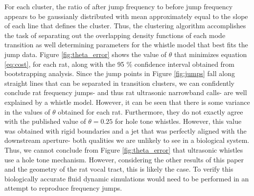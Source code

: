 \documentclass[twocolumn, prX]{revtex4}
\begin{document}
For each cluster, the ratio of after jump frequency to before jump frequency appears to be gaussianly distributed with mean approximately equal to the slope of each line that defines the cluster. Thus, the clustering algorithm accomplishes the task of separating out the overlapping density functions of each mode transition as well determining parameters for the whistle model that best fits the jump data. Figure \ref{fig:theta_error} shows the value of $\theta$ that minimizes equation \ref{eq:cost}, for each rat, along with the 95 \% confidence interval obtained from bootstrapping analysis. Since the jump points in Figure \ref{fig:jumps} fall along straight lines that can be separated in transition clusters, we can confidently conclude rat frequency jumps- and thus rat ultrasonic narrowband calls- are well explained by a whistle model. However, it can be seen that there is some variance in the values of $\theta$ obtained for each rat. Furthermore, they do not exactly agree with the published value of $\theta=0.25$ for hole tone whistles. However, this value was obtained with rigid boundaries and a jet that was perfectly aligned with the downstream aperture- both qualities we are unlikely to see in a biological system. Thus, we cannot conclude from Figure \ref{fig:theta_error} that ultrasonic whistles use a hole tone mechanism. However, considering the other results of this paper and the geometry of the rat vocal tract, this is likely the case. To verify this biologically accurate fluid dynamic simulations would need to be performed in an attempt to reproduce frequency jumps. 
\end{document}
